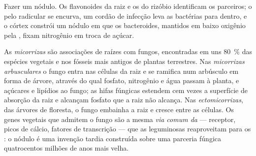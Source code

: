 \begin{omfigure}
{\small Fazer um nódulo. Os flavonoides da raiz e os  do
rizóbio identificam os parceiros; o pelo radicular se encurva, um
cordão de infecção leva as bactérias para dentro, e o córtex constrói
um nódulo em que os bacteroides, mantidos em baixo oxigênio pela
, fixam nitrogênio em troca de açúcar.}
\end{omfigure}

\begin{definition}[Micorrizas]\label{def:b3:microbiomes:mycorrhiza}
As \emph{micorrizas} são associações de raízes com fungos, encontradas
em uns \qty{80}{\%} das espécies vegetais e nos fósseis mais antigos de
plantas terrestres. Nas \emph{micorrizas arbusculares} o fungo entra
nas células da raiz e se ramifica num arbúsculo em forma de árvore,
através do qual fosfato, nitrogênio e água passam à planta, e açúcares
e lipídios ao fungo; as hifas fúngicas estendem cem vezes a superfície
de absorção da raiz e alcançam fosfato que a raiz não alcança. Nas
\emph{ectomicorrizas}, das árvores de floresta, o fungo embainha a raiz
e cresce entre as células. Os genes vegetais que admitem o fungo são a
mesma \emph{via comum da } --- receptor, picos de cálcio,
fatores de transcrição --- que as leguminosas reaproveitam para os
: o nódulo é uma invenção tardia construída sobre uma parceria
fúngica quatrocentos milhões de anos mais velha.
\end{definition}

